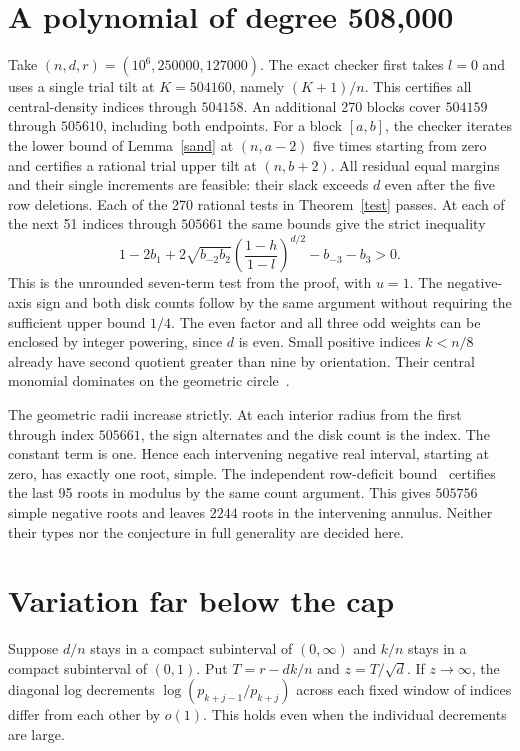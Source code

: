 \documentclass[11pt]{article}
\begin{document}
\section{A polynomial of degree 508,000}
Take $(n,d,r)=(10^6,250000,127000)$. The exact checker first takes $l=0$ and uses a single trial tilt at $K=504160$, namely $(K+1)/n$. This certifies all central-density indices through $504158$. An additional 270 blocks cover $504159$ through $505610$, including both endpoints. For a block $[a,b]$, the checker iterates the lower bound of Lemma~\ref{sand} at $(n,a-2)$ five times starting from zero and certifies a rational trial upper tilt at $(n,b+2)$. All residual equal margins and their single increments are feasible: their slack exceeds $d$ even after the five row deletions. Each of the 270 rational tests in Theorem~\ref{test} passes. At each of the next 51 indices through $505661$ the same bounds give the strict inequality
\[
1-2b_1+2\sqrt{b_{-2}b_2}\left(\frac{1-h}{1-l}\right)^{d/2}-b_{-3}-b_3>0 .
\]
This is the unrounded seven-term test from the proof, with $u=1$. The negative-axis sign and both disk counts follow by the same argument without requiring the sufficient upper bound $1/4$. The even factor and all three odd weights can be enclosed by integer powering, since $d$ is even. Small positive indices $k<n/8$ already have second quotient greater than nine by orientation. Their central monomial dominates on the geometric circle~\cite{outer}.

The geometric radii increase strictly. At each interior radius from the first through index $505661$, the sign alternates and the disk count is the index. The constant term is one. Hence each intervening negative real interval, starting at zero, has exactly one root, simple. The independent row-deficit bound~\cite{outer} certifies the last 95 roots in modulus by the same count argument. This gives $505756$ simple negative roots and leaves $2244$ roots in the intervening annulus. Neither their types nor the conjecture in full generality are decided here.

\section{Variation far below the cap}
Suppose $d/n$ stays in a compact subinterval of $(0,\infty)$ and $k/n$ stays in a compact subinterval of $(0,1)$. Put $T=r-dk/n$ and $z=T/\sqrt d$. If $z\to\infty$, the diagonal log decrements $\log(p_{k+j-1}/p_{k+j})$ across each fixed window of indices differ from each other by $o(1)$. This holds even when the individual decrements are large.
\end{document}
